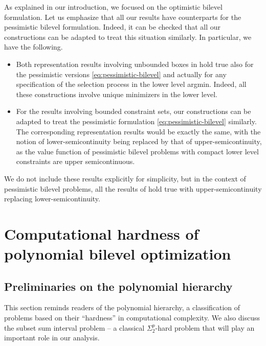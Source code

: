 \documentclass{article}
\newcommand{\existleveltwo}{\Sigma_2^p}
\newcommand{\jer}[1]{[[\textcolor{magenta}{#1}]]}
\theoremstyle{plain}
\theoremstyle{definition}
\begin{document}
As explained in our introduction, we focused on the optimistic bilevel formulation. Let us emphasize that all our results have counterparts for the pessimistic bilevel formulation. Indeed, it can be checked that all our constructions can be adapted to treat this situation similarly. In particular, we have the following.
\begin{itemize}
    \item Both representation results involving unbounded boxes in  hold true also for the pessimistic versions \eqref{eq:pessimistic-bilevel} and actually for any specification of the selection process in the lower level argmin. Indeed, all these constructions involve unique minimizers in the lower level.
    \item For the results involving bounded constraint sets, our constructions can be adapted to treat the pessimistic formulation \eqref{eq:pessimistic-bilevel} similarly. The corresponding representation results would be exactly the same, with the notion of lower-semicontinuity being replaced by that of upper-semicontinuity, as the value function of pessimistic bilevel problems with compact lower level constraints are upper semicontinuous.
\end{itemize}
We do not include these results explicitly for simplicity, but in the context of pessimistic bilevel problems, all the results of  hold true with upper-semicontinuity replacing lower-semicontinuity.

\section{Computational hardness of polynomial bilevel optimization}



\subsection{Preliminaries on the polynomial hierarchy}
\label{subsec:premilinary-poly-hierarchy}
This section reminds readers of the polynomial hierarchy, a classification of problems based on their ``hardness'' in computational complexity. We also discuss the subset sum interval problem -- a classical $\existleveltwo$-hard problem that will play an important role in our analysis. 
\end{document}
